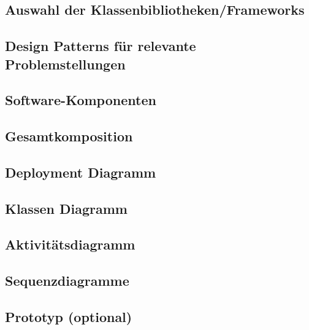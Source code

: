 \subsection{Auswahl der Klassenbibliotheken/Frameworks} \label{Auswahl der Klassenbibliotheken/Frameworks}
\subsection{Design Patterns für relevante Problemstellungen}
\subsection{Software-Komponenten}
\subsection{Gesamtkomposition}
\subsection{Deployment Diagramm}
\subsection{Klassen Diagramm}
\subsection{Aktivitätsdiagramm}
\subsection{Sequenzdiagramme}
\subsection{Prototyp (optional)}